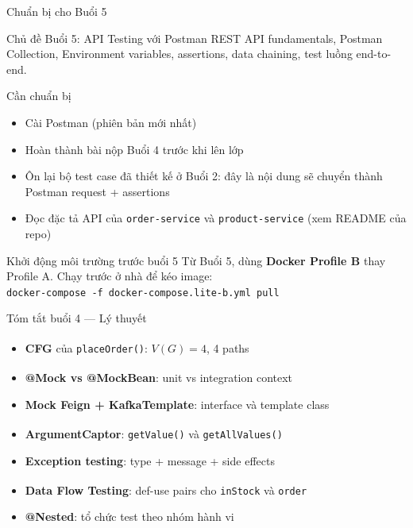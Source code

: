 \documentclass[aspectratio=169,10pt]{beamer}
\newcommand{\sref}[1]{\textsuperscript{\scriptsize\cite{#1}}}
\begin{document}
\begin{frame}[shrink=16]{Chuẩn bị cho Buổi 5}
  \begin{block}{Chủ đề Buổi 5: API Testing với Postman}
    REST API fundamentals, Postman Collection, Environment variables,
    assertions, data chaining, test luồng end-to-end.
  \end{block}

  \vspace{0.4em}
  \begin{block}{Cần chuẩn bị}
    \begin{itemize}
      \item Cài Postman (phiên bản mới nhất)
      \item Hoàn thành bài nộp Buổi 4 trước khi lên lớp
      \item Ôn lại bộ test case đã thiết kế ở Buổi 2:
        đây là nội dung sẽ chuyển thành Postman request + assertions
      \item Đọc đặc tả API của \texttt{order-service} và
        \texttt{product-service} (xem README của repo)
    \end{itemize}
  \end{block}

  \begin{alertblock}{Khởi động môi trường trước buổi 5}
    Từ Buổi 5, dùng \textbf{Docker Profile B} thay Profile A.
    Chạy trước ở nhà để kéo image:\\
    \texttt{docker-compose -f docker-compose.lite-b.yml pull}
  \end{alertblock}
\end{frame}

\begin{frame}{Tóm tắt buổi 4 --- Lý thuyết}
  \begin{itemize}
    \item \textbf{CFG} của \texttt{placeOrder()}: $V(G)=4$, 4 paths\sref{myers}
    \item \textbf{@Mock vs @MockBean}: unit vs integration context\sref{mockito}
    \item \textbf{Mock Feign + KafkaTemplate}: interface và template class
    \item \textbf{ArgumentCaptor}: \texttt{getValue()} và \texttt{getAllValues()}\sref{mockito}
    \item \textbf{Exception testing}: type + message + side effects
    \item \textbf{Data Flow Testing}: def-use pairs cho \texttt{inStock} và \texttt{order}\sref{istqb}
    \item \textbf{@Nested}: tổ chức test theo nhóm hành vi
  \end{itemize}
\end{frame}
\end{document}
